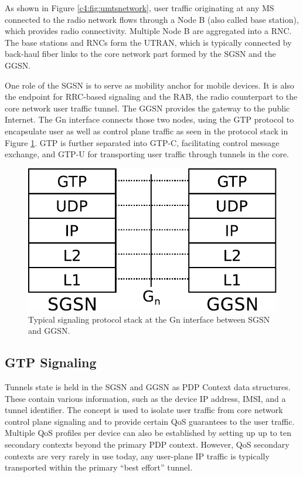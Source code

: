 As shown in Figure \ref{c4:fig:umtsnetwork}, user traffic originating at any \ac{MS} connected to the radio network flows through a Node B (also called base station), which provides radio connectivity. Multiple Node B are aggregated into a \ac{RNC}. The base stations and \acp{RNC} form the \ac{UTRAN}, which is typically connected by back-haul fiber links to the core network part formed by the \ac{SGSN} and the \ac{GGSN}.

One role of the \ac{SGSN} is to serve as mobility anchor for mobile devices. It is also the endpoint for \ac{RRC}-based signaling and the \ac{RAB}, the radio counterpart to the core network user traffic tunnel. The \ac{GGSN} provides the gateway to the public Internet. The Gn interface connects those two nodes, using the \ac{GTP} protocol to encapsulate user as well as control plane traffic as seen in the protocol stack in Figure \ref{c4:fig:signallingstack}. \ac{GTP} is further separated into GTP-C, facilitating control message exchange, and GTP-U for transporting user traffic through tunnels in the core.

\begin{figure}[htbp]
	\centering
	\includegraphics[width=0.6\columnwidth]{images/signalling-stack.pdf}
	\caption{Typical signaling protocol stack at the Gn interface between \ac{SGSN} and \ac{GGSN}.}
	\label{c4:fig:signallingstack}
\end{figure}


\subsection{GTP Signaling}

Tunnels state is held in the \ac{SGSN} and \ac{GGSN} as \ac{PDP} Context data structures. These contain various information, such as the device IP address, \ac{IMSI}, and a tunnel identifier. The concept is used to isolate user traffic from core network control plane signaling and to provide certain \ac{QoS} guarantees to the user traffic. Multiple \ac{QoS} profiles per device can also be established by setting up up to ten secondary contexts beyond the primary PDP context. However, \ac{QoS} secondary contexts are very rarely in use today, any user-plane IP traffic is typically transported within the primary ``best effort'' tunnel.

